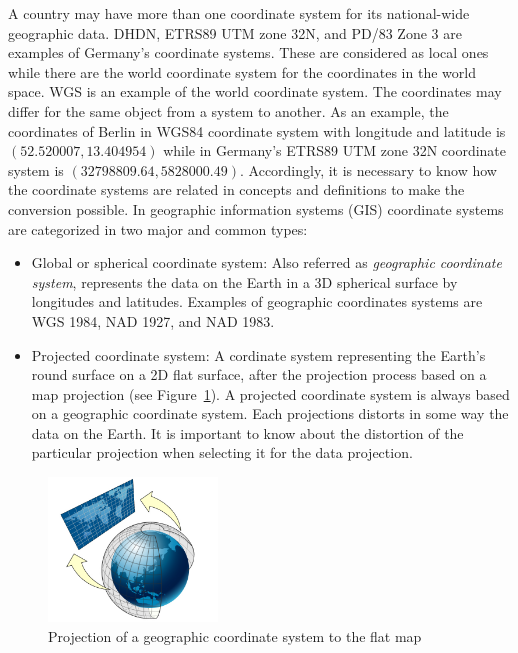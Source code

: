 \documentclass[a4paper,12pt]{article}
\begin{document}
A country may have more than one coordinate system for its national-wide geographic data. DHDN, ETRS89 UTM zone 32N, and PD/83 Zone 3 are examples of Germany's coordinate systems. These are considered as local ones while there are the world coordinate system for the coordinates in the world space. WGS is an example of the world coordinate system. The coordinates may differ for the same object from a system to another. As an example, the coordinates of Berlin in WGS84 coordinate system with longitude and latitude is $(52.520007, 13.404954)$ while in Germany's ETRS89 UTM zone 32N coordinate system is $(32798809.64, 5828000.49)$. Accordingly, it is necessary to know how the coordinate systems are related in concepts and definitions to make the conversion possible. 
In geographic information systems (GIS) coordinate systems are categorized in two major and common types:
\begin{itemize}
\item Global or spherical coordinate system: Also referred as \textit{geographic coordinate system}, represents the data on the Earth in a 3D spherical surface by longitudes and latitudes. Examples of geographic coordinates systems are WGS 1984, NAD 1927, and NAD 1983. 

\item Projected coordinate system: A cordinate system representing the Earth's round surface on a 2D flat surface, after the projection process based on a map projection (see Figure~\ref{figproject}). A projected coordinate system is always based on a geographic coordinate system. Each projections distorts in some way the data on the Earth. It is important to know about the distortion of the particular projection when selecting it for the data projection. %
\end{itemize}

\begin{figure}
\centering
\includegraphics[width=0.4\textwidth]{sphere_to_cylinder}
\caption{Projection of a geographic coordinate system to the flat map}
\label{figproject}
\end{figure}
\end{document}
